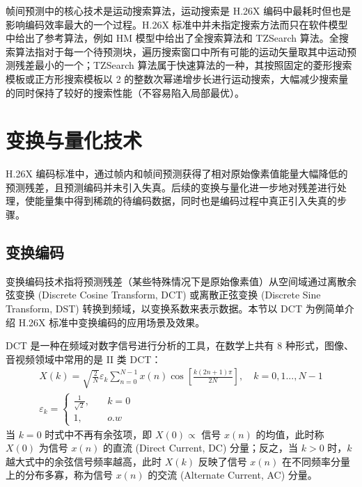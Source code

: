 帧间预测中的核心技术是运动搜索算法，运动搜索是 H.26X 编码中最耗时但也是影响编码效率最大的一个过程。H.26X 标准中并未指定搜索方法而只在软件模型中给出了参考算法，例如 HM 模型中给出了全搜索算法和 TZSearch 算法。全搜索算法指对于每一个待预测块，遍历搜索窗口中所有可能的运动矢量取其中运动预测残差最小的一个；TZSearch 算法属于快速算法的一种，其按照固定的菱形搜索模板或正方形搜索模板以 2 的整数次幂递增步长进行运动搜索，大幅减少搜索量的同时保持了较好的搜索性能（不容易陷入局部最优）。

\section{变换与量化技术}
H.26X 编码标准中，通过帧内和帧间预测获得了相对原始像素值能量大幅降低的预测残差，且预测编码并未引入失真。后续的变换与量化进一步地对残差进行处理，使能量集中得到稀疏的待编码数据，同时也是编码过程中真正引入失真的步骤。
\subsection{变换编码}
\label{cha:TransformOverview}
变换编码技术指将预测残差（某些特殊情况下是原始像素值）从空间域通过离散余弦变换 (Discrete Cosine Transform, DCT) 或离散正弦变换 (Discrete Sine Transform, DST) 转换到频域，以变换系数来表示数据。本节以 DCT 为例简单介绍 H.26X 标准中变换编码的应用场景及效果。

DCT 是一种在频域对数字信号进行分析的工具，在数学上共有 8 种形式，图像、音视频领域中常用的是 II 类 DCT：
\begin{equation}
    \begin{gathered}
        X(k) = \sqrt{\frac{2}{N}}\varepsilon_{k}\sum_{n=0}^{N-1}x(n)\cos\left[\frac{k(2n+1)\pi}{2N}\right], \quad k=0,1...,N-1 \\
        \varepsilon_{k}= \left\{
        \begin{aligned}
            \frac{1}{\sqrt{2}}, \quad &k=0 \\
            1, \quad &o.w
        \end{aligned} \right.
    \end{gathered}
    \label{equ:1ddct}
\end{equation}
当 $k=0$ 时式中不再有余弦项，即 $X(0)\propto$ 信号 $x(n)$ 的均值，此时称 $X(0)$ 为信号 $x(n)$ 的直流 (Direct Current, DC) 分量；反之，当 $k>0$ 时，$k$ 越大式中的余弦信号频率越高，此时 $X(k)$ 反映了信号 $x(n)$ 在不同频率分量上的分布多寡，称为信号 $x(n)$ 的交流 (Alternate Current, AC) 分量。

